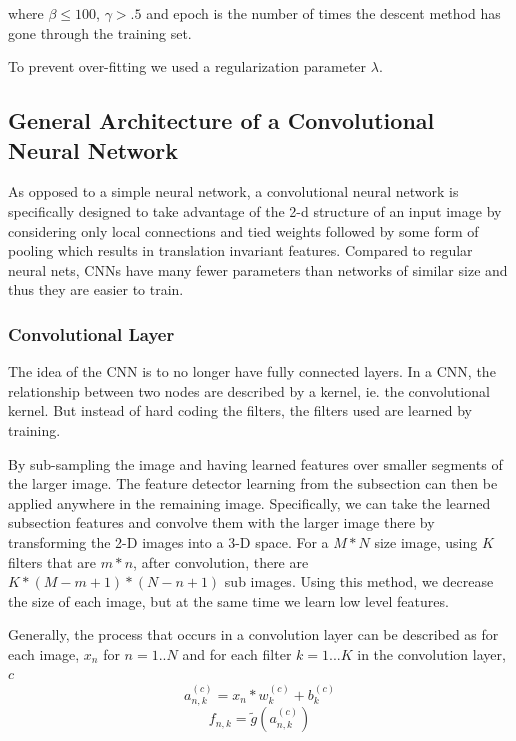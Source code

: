 \documentclass[12pt, twocolumn]{article}
\begin{document}
where $\beta \leq 100$, $\gamma >.5$ and epoch is the number of times the descent method has gone through the training set.  
\newline\newline

To prevent over-fitting we used a regularization parameter $\lambda$. 


\subsection{General Architecture of a Convolutional Neural Network}
As opposed to a simple neural network, a convolutional neural network is specifically designed to take advantage of the 2-d structure of an input image by considering only local connections and tied weights followed by some form of pooling which results in translation invariant features. Compared to regular neural nets,  CNNs  have many fewer parameters than networks of similar size and thus they are easier to train. 



\subsubsection{Convolutional Layer}
The idea of the CNN is to no longer have fully connected layers. In a CNN, the relationship between two nodes are described by a kernel, ie. the convolutional kernel. But instead of hard coding the filters, the filters used are learned by training. 

By sub-sampling the image and having learned features over smaller segments of the larger image. The feature detector learning from the subsection can then be applied anywhere in the remaining image. Specifically, we can take the learned subsection features and convolve them with the larger image there by transforming the 2-D images into a 3-D space. For a  $M * N $ size image, using $K$ filters that are $m * n$,  after convolution, there are  $ K * (M - m + 1) * (N - n + 1) $ sub images. Using this method, we decrease the size of each image, but at the same time we learn low level features. 


Generally, the process that occurs in a convolution layer can be described as for each image, $x_n$ for $n=1..N$ and for each filter $k=1...K$ in the convolution layer, $c$
\begin{equation}
a_{n,k}^{(c)}= x_n \ast w_k^{(c)} + b_k^{(c)}
\end{equation}
\begin{equation}
f_{n,k}= \tilde{g}(a_{n,k}^{(c)})
\end{equation}
 
\end{document}
